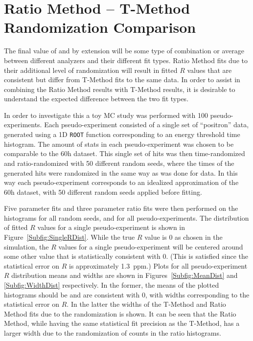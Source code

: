 
\thispagestyle{myheadings}

\graphicspath{{Body/Figures/Wa/T-Method-Comparison/}}

\chapter{Ratio Method -- T-Method Randomization Comparison}
\label{app:RTComparison}


The final value of \wa and by extension \amu will be some type of combination or average between different analyzers and their different fit types. Ratio Method fits due to their additional level of randomization will result in fitted $R$ values that are consistent but differ from T-Method fits to the same data. In order to assist in combining the Ratio Method results with T-Method results, it is desirable to understand the expected difference between the two fit types.


In order to investigate this a toy MC study was performed with 100 pseudo-experiments. Each pseudo-experiment consisted of a single set of ``positron'' data, generated using a 1D \texttt{ROOT} function corresponding to an energy threshold time histogram. The amount of stats in each pseudo-experiment was chosen to be comparable to the 60h dataset. This single set of hits was then time-randomized and ratio-randomized with 50 different random seeds, where the times of the generated hits were randomized in the same way as was done for data. In this way each pseudo-experiment corresponds to an idealized approximation of the 60h dataset, with 50 different random seeds applied before fitting.

Five parameter fits and three parameter ratio fits were then performed on the histograms for all random seeds, and for all pseudo-experiments. The distribution of fitted $R$ values for a single pseudo-experiment is shown in Figure~\ref{Subfig:SingleRDist}. While the true $R$ value is 0 as chosen in the simulation, the $R$ values for a single pseudo-experiment will be centered around some other value that is statistically consistent with 0. (This is satisfied since the statistical error on $R$ is approximately \SI{1.3}{ppm}.) Plots for all pseudo-experiment $R$ distribution means and widths are shown in Figures~\ref{Subfig:MeanDist} and \ref{Subfig:WidthDist} respectively. In the former, the means of the plotted histograms should be and are consistent with 0, with widths corresponding to the statistical error on $R$. In the latter the widths of the T-Method and Ratio Method fits due to the randomization is shown. It can be seen that the Ratio Method, while having the same statistical fit precision as the T-Method, has a larger width due to the randomization of counts in the ratio histograms. 


